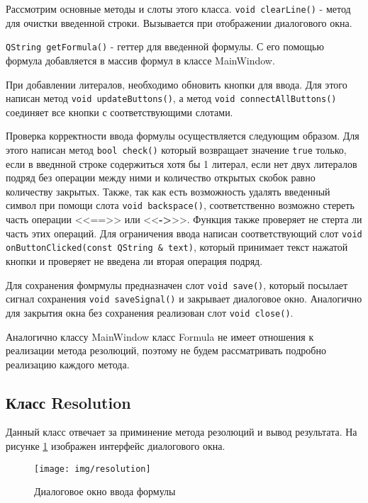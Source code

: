 \documentclass[12pt, a4paper]{article}
\begin{document}
	 \par Рассмотрим основные методы и слоты этого класса. \texttt{void clearLine()} - метод для очистки введенной строки. Вызывается при отображении диалогового окна.
	 \par \texttt{QString getFormula()} - геттер для введенной формулы. С его помощью формула добавляется в массив формул в классе MainWindow. 
	 \par При добавлении литералов, необходимо обновить кнопки для ввода. Для этого написан метод \texttt{void updateButtons()}, а метод \texttt{void connectAllButtons()} соединяет все кнопки с соответствующими слотами.
	 \par Проверка корректности ввода формулы осуществляется следующим образом. Для этого написан метод \texttt{bool check()} который возвращает значение \texttt{true} только, если в введнной строке содержиться хотя бы 1 литерал, если нет двух литералов подряд без операции между ними и количество открытых скобок равно количеству закрытых. Также, так как есть возможность удалять введенный символ при помощи слота \texttt{void backspace()}, соответственно возможно стереть часть операции <<==>> или <<\textbf{->}>>. Функция также проверяет не стерта ли часть этих операций. Для ограничения ввода написан соответствующий слот \texttt{void onButtonClicked(const QString \& text)}, который принимает текст нажатой кнопки и проверяет не введена ли вторая операция подряд. 
	 \par  Для сохранения фомрмулы предназначен слот \texttt{void save()}, который посылает сигнал сохранения \texttt{void saveSignal()} и закрывает диалоговое окно. Аналогично для закрытия окна без сохранения реализован слот \texttt{void close()}. 
	 \par Аналогично классу MainWindow класс Formula не имеет отношения к реализации метода резолюций, поэтому не будем рассматривать подробно реализацию каждого метода. 
	  \begin{center}
	 	\subsection{Класс Resolution}
	 \end{center} 
	 \par Данный класс отвечает за приминение метода резолюций и вывод результата. На рисунке \ref{fig:resolution} изображен интерфейс диалогового окна.
	 \begin{figure}[h!]
	 	\centering
	 	\texttt{[image: img/resolution]}
	 	\caption{Диалоговое окно ввода формулы}
	 	\label{fig:resolution}
	 \end{figure}\\
\end{document}
